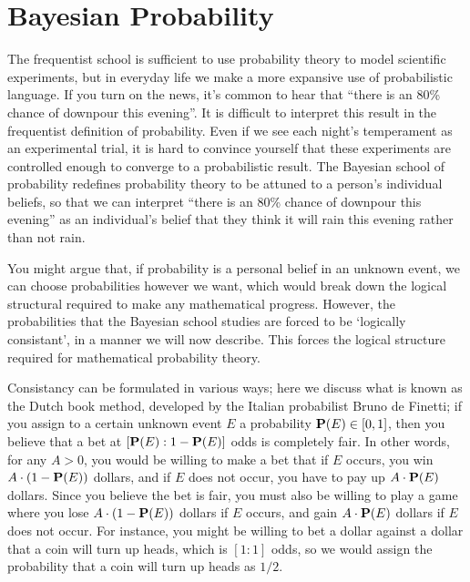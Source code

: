 \section{Bayesian Probability}

The frequentist school is sufficient to use probability theory to model scientific experiments, but in everyday life we make a more expansive use of probabilistic language. If you turn on the news, it's common to hear that ``there is an 80\% chance of downpour this evening''. It is difficult to interpret this result in the frequentist definition of probability. Even if we see each night's temperament as an experimental trial, it is hard to convince yourself that these experiments are controlled enough to converge to a probabilistic result. The Bayesian school of probability redefines probability theory to be attuned to a person's individual beliefs, so that we can interpret ``there is an 80\% chance of downpour this evening'' as an individual's belief that they think it will rain this evening rather than not rain.

You might argue that, if probability is a personal belief in an unknown event, we can choose probabilities however we want, which would break down the logical structural required to make any mathematical progress. However, the probabilities that the Bayesian school studies are forced to be `logically consistant', in a manner we will now describe. This forces the logical structure required for mathematical probability theory.

Consistancy can be formulated in various ways; here we discuss what is known as the Dutch book method, developed by the Italian probabilist Bruno de Finetti; if you assign to a certain unknown event $E$ a probability $\mathbf{P}(E) \in [0,1]$, then you believe that a bet at $[\mathbf{P}(E) : 1 - \mathbf{P}(E)]$ odds is completely fair. In other words, for any $A > 0$, you would be willing to make a bet that if $E$ occurs, you win $A \cdot (1 - \mathbf{P}(E))$ dollars, and if $E$ does not occur, you have to pay up $A \cdot \mathbf{P}(E)$ dollars. Since you believe the bet is fair, you must also be willing to play a game where you lose $A \cdot (1 - \mathbf{P}(E))$ dollars if $E$ occurs, and gain $A \cdot \mathbf{P}(E)$ dollars if $E$ does not occur. For instance, you might be willing to bet a dollar against a dollar that a coin will turn up heads, which is $[1:1]$ odds, so we would assign the probability that a coin will turn up heads as $1/2$.

